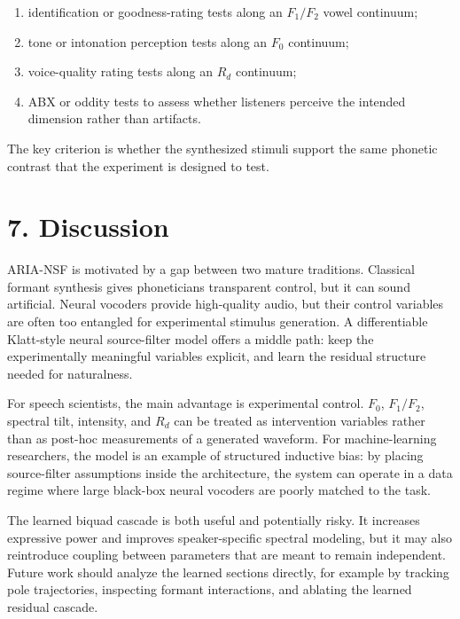 \begin{enumerate}
\def\labelenumi{\arabic{enumi}.}
\tightlist
\item
  identification or goodness-rating tests along an \(F_1/F_2\) vowel
  continuum;
\item
  tone or intonation perception tests along an \(F_0\) continuum;
\item
  voice-quality rating tests along an \(R_d\) continuum;
\item
  ABX or oddity tests to assess whether listeners perceive the intended
  dimension rather than artifacts.
\end{enumerate}

The key criterion is whether the synthesized stimuli support the same
phonetic contrast that the experiment is designed to test.

\section{7. Discussion}\label{discussion}

ARIA-NSF is motivated by a gap between two mature traditions. Classical
formant synthesis gives phoneticians transparent control, but it can
sound artificial. Neural vocoders provide high-quality audio, but their
control variables are often too entangled for experimental stimulus
generation. A differentiable Klatt-style neural source-filter model
offers a middle path: keep the experimentally meaningful variables
explicit, and learn the residual structure needed for naturalness.

For speech scientists, the main advantage is experimental control.
\(F_0\), \(F_1/F_2\), spectral tilt, intensity, and \(R_d\) can be
treated as intervention variables rather than as post-hoc measurements
of a generated waveform. For machine-learning researchers, the model is
an example of structured inductive bias: by placing source-filter
assumptions inside the architecture, the system can operate in a data
regime where large black-box neural vocoders are poorly matched to the
task.

The learned biquad cascade is both useful and potentially risky. It
increases expressive power and improves speaker-specific spectral
modeling, but it may also reintroduce coupling between parameters that
are meant to remain independent. Future work should analyze the learned
sections directly, for example by tracking pole trajectories, inspecting
formant interactions, and ablating the learned residual cascade.

